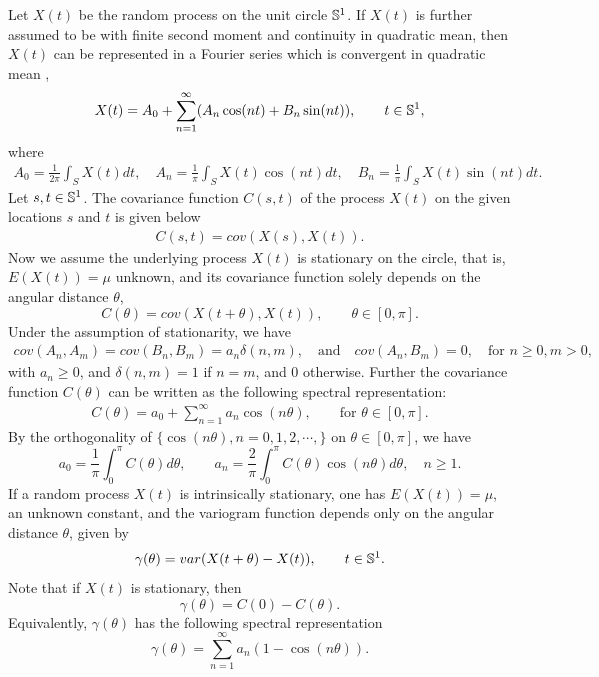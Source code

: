 Let $X(t)$ be the random process on the unit circle $\mathbb{S}^1$. If $X(t)$ is further assumed to be with finite second moment and continuity in quadratic mean, then $X(t)$ can be represented in a Fourier series which is convergent in quadratic mean \citep{DUFOUR1976107},
\[
X(t) = A_0 + \sum_{n=1}^\infty (A_n\cos(nt) + B_n \sin(nt)), \quad \quad t \in \mathbb{S}^1,
\]
where
\begin{eqnarray*}
A_0 = \frac{1}{2\pi}\int_S X(t)dt, \quad A_n = \frac{1}{\pi}\int_S X(t)\cos(nt)dt, \quad B_n = \frac{1}{\pi}\int_S X(t)\sin(nt)dt.
\end{eqnarray*}
Let $s, t \in \mathbb{S}^1$. The covariance function $C(s, t)$ of the process $X(t)$ on the given locations $s$ and $t$ is given below
\begin{eqnarray*}
C(s, t) = cov(X(s), X(t)).
\end{eqnarray*}
Now we assume the underlying process $X(t)$ is stationary on the circle, that is, $E(X(t)) = \mu$ unknown, and its covariance function solely depends on the angular distance $\theta$,
\[
C(\theta) = cov(X(t+\theta), X(t)), \quad \quad \theta \in [0, \pi].
\]
Under the assumption of stationarity, we have
\begin{eqnarray*}
cov(A_n, A_m) = cov(B_n, B_m) = a_n \delta(n, m), \quad \mbox{and} \quad cov(A_n, B_m) = 0, \quad \mbox{for $n \ge 0, m > 0$},
\end{eqnarray*}
with $a_n \ge 0$, and $\delta(n,m)=1$ if $n=m$, and 0 otherwise. Further the covariance function $C(\theta)$ can be written as the following spectral representation:
\begin{eqnarray*}
C(\theta) = a_0 + \sum_{n=1}^\infty a_n \cos(n\theta), \quad \quad \mbox{for $\theta \in [0, \pi]$}.
\end{eqnarray*}
By the orthogonality of $\{\cos(n\theta), n = 0, 1, 2, \cdots,\}$ on $\theta \in [0, \pi]$, we have
\[
a_0 = \frac{1}{\pi}\int_0^\pi C(\theta)d\theta, \quad \quad a_n = \frac{2}{\pi}\int_0^\pi C(\theta)\cos(n\theta)d\theta, \quad n \ge 1.
\]
If a random process $X(t)$ is intrinsically stationary, one has $E(X(t)) = \mu$, an unknown constant, and the variogram function depends only on the angular distance $\theta$, given by
\begin{eqnarray*}
\gamma(\theta) = var(X(t+\theta) - X(t)), \quad \quad t \in \mathbb{S}^1.
\end{eqnarray*}
Note that if $X(t)$ is stationary, then
\[
\gamma(\theta) = C(0) - C(\theta).
\]
Equivalently, $\gamma(\theta)$ has the following spectral representation
\[
\gamma(\theta) = \sum_{n = 1}^\infty a_n (1 - \cos(n\theta)).
\]


